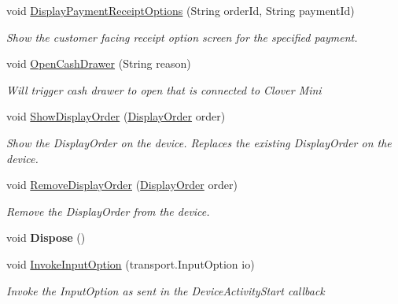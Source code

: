 \begin{DoxyCompactItemize}
void \hyperlink{interfacecom_1_1clover_1_1remotepay_1_1sdk_1_1_i_clover_connector_ae60f9c25fa8cc54e3102fcde8ab0b869}{Display\+Payment\+Receipt\+Options} (String order\+Id, String payment\+Id)
\begin{DoxyCompactList}\small\item\em Show the customer facing receipt option screen for the specified payment. \end{DoxyCompactList}\item 
void \hyperlink{interfacecom_1_1clover_1_1remotepay_1_1sdk_1_1_i_clover_connector_a0fc361c449dc63eab061ca6866124deb}{Open\+Cash\+Drawer} (String reason)
\begin{DoxyCompactList}\small\item\em Will trigger cash drawer to open that is connected to Clover Mini \end{DoxyCompactList}\item 
void \hyperlink{interfacecom_1_1clover_1_1remotepay_1_1sdk_1_1_i_clover_connector_a50be4c513f6f67971b51f6f76f30ac06}{Show\+Display\+Order} (\hyperlink{classcom_1_1clover_1_1remote_1_1order_1_1_display_order}{Display\+Order} order)
\begin{DoxyCompactList}\small\item\em Show the Display\+Order on the device. Replaces the existing Display\+Order on the device. \end{DoxyCompactList}\item 
void \hyperlink{interfacecom_1_1clover_1_1remotepay_1_1sdk_1_1_i_clover_connector_a55ebe329c852bedccaeb882ca71c4774}{Remove\+Display\+Order} (\hyperlink{classcom_1_1clover_1_1remote_1_1order_1_1_display_order}{Display\+Order} order)
\begin{DoxyCompactList}\small\item\em Remove the Display\+Order from the device. \end{DoxyCompactList}\item 
\mbox{\label{interfacecom_1_1clover_1_1remotepay_1_1sdk_1_1_i_clover_connector_a105ca79ce329b1b7427450c323bc1d70}} 
void {\bfseries Dispose} ()
\item 
void \hyperlink{interfacecom_1_1clover_1_1remotepay_1_1sdk_1_1_i_clover_connector_af4e56b0504d5e26d2953b5544bd8cf05}{Invoke\+Input\+Option} (transport.\+Input\+Option io)
\begin{DoxyCompactList}\small\item\em Invoke the Input\+Option as sent in the Device\+Activity\+Start callback \end{DoxyCompactList}\item 

\end{DoxyCompactItemize}
